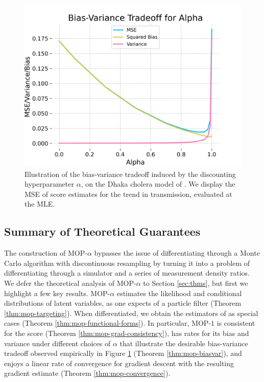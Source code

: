 \documentclass[9pt,twocolumn,pnasresearcharticle]{pnas-new}
\newcommand\arxiv[2]{#2} %
\begin{document}
\begin{figure}[ht!]
  \centering
    \includegraphics[width=\arxiv{10cm}{\textwidth/3}]{imgs/095/biasvar.png}
    \caption{Illustration of the bias-variance tradeoff induced by the discounting hyperparameter $\alpha$, on the Dhaka cholera model of \cite{king08}. We display the MSE of score estimates for the trend in transmission, evaluated at the MLE.}
    \label{fig:biasvar}
    \arxiv{}{\vspace*{-1ex}}
\end{figure}

\arxiv{}{\vspace*{-2mm}}
\subsection{Summary of Theoretical Guarantees}

The construction of MOP-$\alpha$ bypasses the issue of differentiating through a Monte Carlo algorithm with discontinuous resampling by turning it into a problem of differentiating through a simulator and a series of measurement density ratios.
We defer the theoretical analysis of MOP-$\alpha$ to Section \ref{sec:thms}, but first we highlight a few key results.
MOP-$\alpha$ estimates the likelihood and conditional distributions of latent variables, as one expects of a particle filter (Theorem \ref{thm:mop-targeting}).
When differentiated, we obtain the estimators of \cite{poyiadjis11, scibior21, naesseth18} as special cases (Theorem \ref{thm:mop-functional-forms}).
In particular, MOP-$1$ is consistent for the score (Theorem \ref{thm:mop-grad-consistency}), has rates for its bias and variance under different choices of $\alpha$ that illustrate the desirable bias-variance tradeoff observed empirically in Figure \ref{fig:biasvar}  (Theorem \ref{thm:mop-biasvar}), and enjoys a linear rate of convergence for gradient descent with the resulting gradient estimate (Theorem \ref{thm:mop-convergence}).  
\end{document}
